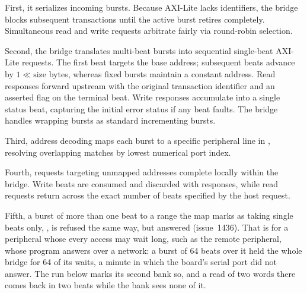\documentclass[journal,9pt]{IEEEtran}
\newcommand{\litepart}[3]{%
}
\begin{document}
First, it serializes incoming bursts. Because AXI-Lite lacks identifiers,
the bridge blocks subsequent transactions until the active burst retires
completely. Simultaneous read and write requests arbitrate fairly via
round-robin selection.

Second, the bridge translates multi-beat bursts into sequential single-beat
AXI-Lite requests. The first beat targets the base address; subsequent beats
advance by \(1 \ll \text{size}\) bytes, whereas fixed bursts maintain a
constant address. Read responses forward upstream with the original
transaction identifier and an asserted  flag on the terminal
beat. Write responses accumulate into a single status beat, capturing the
initial error status if any beat faults. The bridge handles wrapping bursts
as standard incrementing bursts.

Third, address decoding maps each burst to a specific peripheral line in
, resolving overlapping matches by lowest numerical port index.

Fourth, requests targeting unmapped addresses complete locally within the
bridge. Write beats are consumed and discarded with  responses,
while read requests return  across the exact number of beats
specified by the host request.

Fifth, a burst of more than one beat to a range the map marks as taking
single beats only, , is refused the same way, but
answered  (issue~1436).
That is for a peripheral whose every access may wait long, such as the
remote peripheral, whose program answers over a network: a burst of 64
beats over it held the whole bridge for 64 of its waits, a minute in
which the board's serial port did not answer.
The run below marks its second bank so, and a read of two words there
comes back  in two beats while the bank sees none of it.

\litepart{state}{The bridge's state, for any count of
peripherals.}{lst:a-lite-state}

\litepart{accept}{Taking a burst: the turn between the address
channels, the decode, and the address step.}{lst:a-lite-accept}

\litepart{requests}{A beat's request, to the peripheral the burst
decoded to.}{lst:a-lite-beats-out}

\litepart{answers}{The answer to a beat, from the peripheral or from
the bridge itself, going up.}{lst:a-lite-answers}

\litepart{drives}{The registers: a burst taken, a request sent, a beat
answered.}{lst:a-lite-drives}
\end{document}
